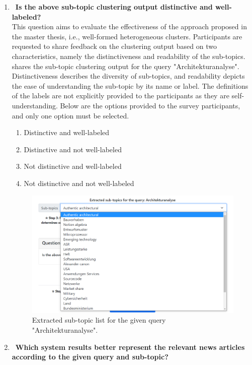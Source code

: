 \begin{enumerate}
	\item ~\textbf{Is the above sub-topic clustering output distinctive and well-labeled?} \\
	
This question aims to evaluate the effectiveness of the approach proposed in the master thesis, i.e., well-formed heterogeneous clusters. Participants are requested to share feedback on the clustering output based on two characteristics, namely the distinctiveness and readability of the sub-topics.  shares the sub-topic clustering output for the query "Architekturanalyse". Distinctiveness describes the diversity of sub-topics, and readability depicts the ease of understanding the sub-topic by its name or label. The definitions of the labels are not explicitly provided to the participants as they are self-understanding. Below are the options provided to the survey participants, and only one option must be selected.

	
	\begin{enumerate}
		\item Distinctive and well-labeled
		\item Distinctive and not well-labeled
		\item Not distinctive and well-labeled
		\item Not distinctive and not well-labeled
	\end{enumerate}
	
	
	\begin{figure}[h]
		\centering
		\includegraphics[width=.8\textwidth]{images/survey/sub-topic-output.png}
		\caption[Sub-topic list example.]{Extracted sub-topic list for the given query "Architekturanalyse". \label{fig:sub_topic_output}}
	\end{figure}
	
	
	\item ~\textbf{Which system results better represent the relevant news articles according to the given query and sub-topic?}  \\
	

\end{enumerate}
